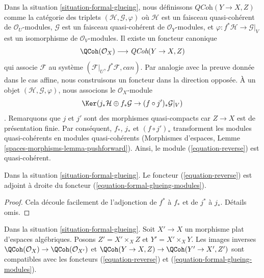 \noindent
Dans la situation \ref{situation-formal-glueing}, nous définissons
$\textit{QCoh}(Y \to X, Z)$ comme la catégorie des
triplets $(\mathcal{H}, \mathcal{G}, \varphi)$ où
$\mathcal{H}$ est un faisceau quasi-cohérent de
$\mathcal{O}_U$-modules, $\mathcal{G}$ est un faisceau quasi-cohérent
de $\mathcal{O}_Y$-modules, et
$\varphi : f^*\mathcal{H} \to \mathcal{G}|_V$ est un isomorphisme
de $\mathcal{O}_V$-modules. Il existe un foncteur canonique
\begin{equation}
\label{equation-formal-glueing-modules}
\QCoh(\mathcal{O}_X) \longrightarrow \textit{QCoh}(Y \to X, Z)
\end{equation}
qui associe $\mathcal{F}$ au système
$(\mathcal{F}|_U, f^*\mathcal{F}, can)$.
Par analogie avec la preuve donnée dans le cas affine, nous construisons
un foncteur dans la direction opposée. À un objet
$(\mathcal{H}, \mathcal{G}, \varphi)$, nous associons le $\mathcal{O}_X$-module
\begin{equation}
\label{equation-reverse}
\Ker(j_*\mathcal{H} \oplus f_*\mathcal{G} \to (f \circ j')_*\mathcal{G}|_V)
\end{equation}.
Remarquons que $j$ et $j'$ sont des morphismes quasi-compacts car
$Z \to X$ est de présentation finie. Par conséquent, $f_*$, $j_*$ et $(f \circ j')_*$
transforment les modules quasi-cohérents en modules quasi-cohérents (Morphismes d'espaces, Lemme \ref{spaces-morphisms-lemma-pushforward}). Ainsi, le module (\ref{equation-reverse}) est quasi-cohérent.

\begin{lemma}
\label{lemma-adjoint}
Dans la situation \ref{situation-formal-glueing}.
Le foncteur (\ref{equation-reverse}) est adjoint à droite du
foncteur (\ref{equation-formal-glueing-modules}).
\end{lemma}

\begin{proof}
Cela découle facilement de l'adjonction de $f^*$ à $f_*$
et de $j^*$ à $j_*$. Détails omis.
\end{proof}

\begin{lemma}
\label{lemma-reverse-commutes-with-flat-base-change}
Dans la situation \ref{situation-formal-glueing}.
Soit $X' \to X$ un morphisme plat d'espaces algébriques.
Posons $Z' = X' \times_X Z$ et $Y' = X' \times_X Y$.
Les images inverses $\QCoh(\mathcal{O}_X) \to \QCoh(\mathcal{O}_{X'})$
et $\QCoh(Y \to X, Z) \to \QCoh(Y' \to X', Z')$ sont compatibles
avec les foncteurs (\ref{equation-reverse}) et
(\ref{equation-formal-glueing-modules}).
\end{lemma}

